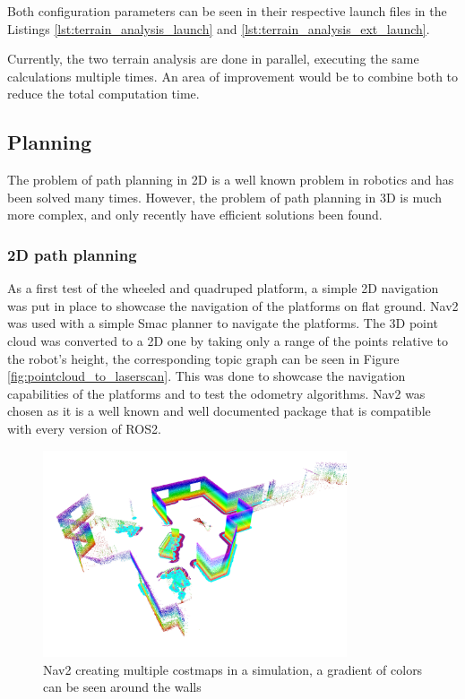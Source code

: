 \documentclass[12pt]{article}
\begin{document}
        Both configuration parameters can be seen in their respective launch files in the Listings \ref{lst:terrain_analysis_launch} and \ref{lst:terrain_analysis_ext_launch}.

        Currently, the two terrain analysis are done in parallel, executing the same calculations multiple times. An area of improvement would be to combine both to reduce the total computation time.



    \subsection{Planning}

        The problem of path planning in 2D is a well known problem in robotics and has been solved many times. However, the problem of path planning in 3D is much more complex, and only recently have efficient solutions been found. 

        \subsubsection{2D path planning}
        As a first test of the wheeled and quadruped platform, a simple 2D navigation was put in place to showcase the navigation of the platforms on flat ground. Nav2 \cite{macenski2020marathon2} was used with a simple Smac planner \cite{macenski2024smac} to navigate the platforms. The 3D point cloud was converted to a 2D one by taking only a range of the points relative to the robot's height, the corresponding topic graph can be seen in Figure \ref{fig:pointcloud_to_laserscan}. This was done to showcase the navigation capabilities of the platforms and to test the odometry algorithms. Nav2 was chosen as it is a well known and well documented package that is compatible with every version of ROS2. 
                
        \begin{figure}[H]
            \centering
            \includegraphics[width=0.8\textwidth]{Images/nav2_costmaps_alpha.png}
            \caption{Nav2 creating multiple costmaps in a simulation, a gradient of colors can be seen around the walls}
            \label{fig:nav2_costmaps}
        \end{figure}
        
\end{document}
